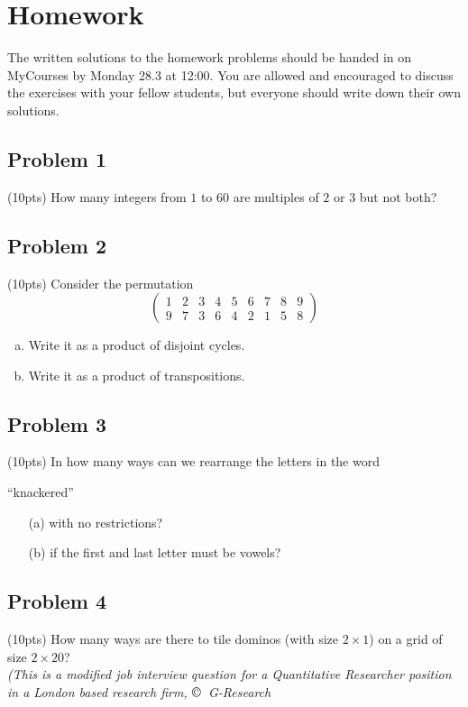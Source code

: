 \documentclass{amsart}
\theoremstyle{definition} \newtheorem*{definition}{Definition}
\theoremstyle{remark} \newtheorem*{ex}{Example}
\begin{document}
\pagebreak

 \section*{Homework}
The written solutions to the homework problems should be handed in on MyCourses by Monday 28.3 at 12:00. You are allowed and encouraged to discuss the exercises with your fellow students, but everyone should write down their own solutions.

\subsection*{Problem 1}(10pts)
How many integers from $1$ to $60$ are multiples of $2$ or $3$ but not both?

\subsection*{Problem 2}(10pts)
Consider the permutation $$\left(\begin{matrix}1& 2& 3& 4& 5& 6& 7& 8& 9 \\
9&7&3&6&4&2&1&5&8\end{matrix}\right)$$
\begin{enumerate}[a)]
\item Write it as a product of disjoint cycles.
\item Write it as a product of transpositions.
\end{enumerate}

\subsection*{Problem 3}(10pts)
In how many ways can we rearrange the letters in the word 
\begin{center}
“knackered”
\end{center}
\begin{itemize}
\item[(a)] with no restrictions?
\item[(b)] if the first and last letter must be vowels?
\end{itemize}


\subsection*{Problem 4}(10pts)
How many ways are there to tile dominos (with size $2 \times 1$) on a grid of size $2 \times 20$? \\
\textit{(This is a modified job interview question for a Quantitative Researcher position in a London based research firm, $\copyright$\, G-Research} 
\end{document}
